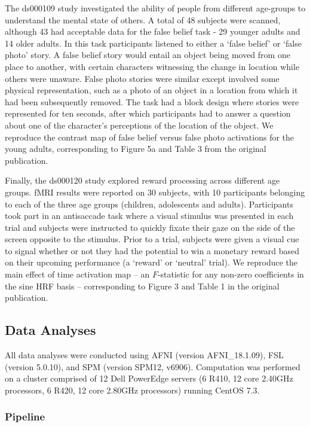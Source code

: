 The ds000109 study investigated the ability of people from different age-groups to understand the mental state of others. A total of 48 subjects were scanned, although 43 had acceptable data for the false belief task - 29 younger adults and 14 older adults. In this task participants listened to either a `false belief' or `false photo' story. A false belief story would entail an object being moved from one place to another, with certain characters witnessing the change in location while others were unaware. False photo stories were similar except involved some physical representation, such as a photo of an object in a location from which it had been subsequently removed. The task had a block design where stories were represented for ten seconds, after which participants had to answer a question about one of the character's perceptions of the location of the object. We reproduce the contrast map of false belief versus false photo activations for the young adults, corresponding to Figure 5a and Table 3 from the original publication.

Finally, the ds000120 study explored reward processing across different age groups. fMRI results were reported on 30 subjects, with 10 participants belonging to each of the three age groups (children, adolescents and adults). Participants took part in an antisaccade task where a visual stimulus was presented in each trial and subjects were instructed to quickly fixate their gaze on the side of the screen opposite to the stimulus. Prior to a trial, subjects were given a visual cue to signal whether or not they had the potential to win a monetary reward based on their upcoming performance (a `reward' or `neutral' trial). We reproduce the main effect of time activation map -- an $F$-statistic for any non-zero coefficients in the sine HRF basis -- corresponding to Figure 3 and Table 1 in the original publication.  

\subsection{Data Analyses}

All data analyses were conducted using AFNI (version AFNI\_18.1.09), FSL (version 5.0.10), and SPM (version SPM12, v6906). Computation was performed on a cluster comprised of 12 Dell PowerEdge servers (6 R410, 12 core 2.40GHz processors, 6 R420, 12 core 2.80GHz processors) running CentOS 7.3.

\subsubsection{Pipeline}

